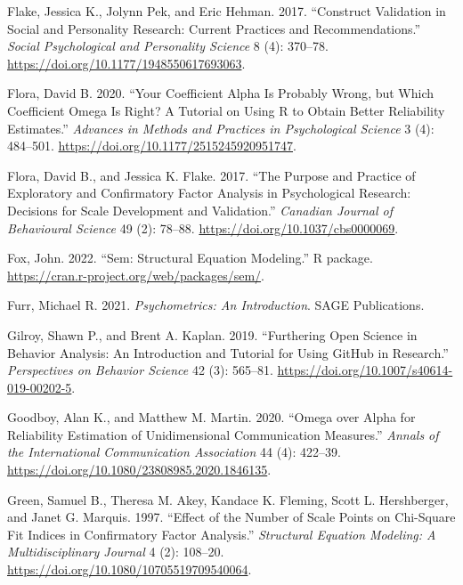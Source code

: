 \documentclass[
  a4paper,
]{article}
\newlength{\cslhangindent}
\newenvironment{CSLReferences}[2] %
 {\begin{list}{}{%
  \setlength{\itemindent}{0pt}
  \setlength{\leftmargin}{0pt}
  \setlength{\parsep}{0pt}
  \ifodd #1
   \setlength{\leftmargin}{\cslhangindent}
   \setlength{\itemindent}{-1\cslhangindent}
  \fi
  \setlength{\itemsep}{#2\baselineskip}}}
 {\end{list}}
\begin{document}
\begin{CSLReferences}{1}{0}
Flake, Jessica K., Jolynn Pek, and Eric Hehman. 2017. {``Construct
{Validation} in {Social} and {Personality Research}: {Current Practices}
and {Recommendations}.''} \emph{Social Psychological and Personality
Science} 8 (4): 370--78. \url{https://doi.org/10.1177/1948550617693063}.

Flora, David B. 2020. {``Your {Coefficient Alpha Is Probably Wrong}, but
{Which Coefficient Omega Is Right}? {A Tutorial} on {Using R} to {Obtain
Better Reliability Estimates}.''} \emph{Advances in Methods and
Practices in Psychological Science} 3 (4): 484--501.
\url{https://doi.org/10.1177/2515245920951747}.

Flora, David B., and Jessica K. Flake. 2017. {``The Purpose and Practice
of Exploratory and Confirmatory Factor Analysis in Psychological
Research: {Decisions} for Scale Development and Validation.''}
\emph{Canadian Journal of Behavioural Science} 49 (2): 78--88.
\url{https://doi.org/10.1037/cbs0000069}.

Fox, John. 2022. {``Sem: {Structural Equation Modeling}.''} R package.
\url{https://cran.r-project.org/web/packages/sem/}.

Furr, Michael R. 2021. \emph{Psychometrics: {An Introduction}}. SAGE
Publications.

Gilroy, Shawn P., and Brent A. Kaplan. 2019. {``Furthering {Open
Science} in {Behavior Analysis}: {An Introduction} and {Tutorial} for
{Using GitHub} in {Research}.''} \emph{Perspectives on Behavior Science}
42 (3): 565--81. \url{https://doi.org/10.1007/s40614-019-00202-5}.

Goodboy, Alan K., and Matthew M. Martin. 2020. {``Omega over Alpha for
Reliability Estimation of Unidimensional Communication Measures.''}
\emph{Annals of the International Communication Association} 44 (4):
422--39. \url{https://doi.org/10.1080/23808985.2020.1846135}.

Green, Samuel B., Theresa M. Akey, Kandace K. Fleming, Scott L.
Hershberger, and Janet G. Marquis. 1997. {``Effect of the Number of
Scale Points on Chi-Square Fit Indices in Confirmatory Factor
Analysis.''} \emph{Structural Equation Modeling: A Multidisciplinary
Journal} 4 (2): 108--20.
\url{https://doi.org/10.1080/10705519709540064}.


\end{CSLReferences}
\end{document}
